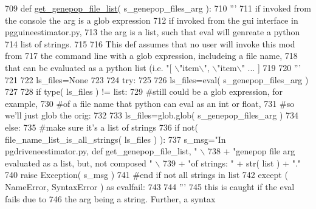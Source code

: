 \begin{DoxyCode}
709 \textcolor{keyword}{def }\hyperlink{namespacenegui_1_1pgdriveneestimator_ad0c4544bb6ce5bc184615cfade0f8495}{get\_genepop\_file\_list}( s\_genepop\_files\_arg ):
710     \textcolor{stringliteral}{'''}
711 \textcolor{stringliteral}{    if invoked from the console the arg is a glob expression}
712 \textcolor{stringliteral}{    if invoked from the gui interface in pgguineestimator.py,}
713 \textcolor{stringliteral}{    the arg is a list, such that eval will genreate a python}
714 \textcolor{stringliteral}{    list of strings.}
715 \textcolor{stringliteral}{}
716 \textcolor{stringliteral}{    This def assumes that no user will invoke this mod from }
717 \textcolor{stringliteral}{    the command line with a glob expression, includeing a file name,}
718 \textcolor{stringliteral}{    that can be evaluated as a python list (i.e. "[ \(\backslash\)"item\(\backslash\)", \(\backslash\)"item\(\backslash\)" ... ]}
719 \textcolor{stringliteral}{    }
720 \textcolor{stringliteral}{    '''}
721 
722     ls\_files=\textcolor{keywordtype}{None}
723 
724     \textcolor{keywordflow}{try}:
725 
726         ls\_files=eval( s\_genepop\_files\_arg )
727 
728         \textcolor{keywordflow}{if} type( ls\_files ) != list:
729             \textcolor{comment}{#still could be a glob expression, for example,}
730             \textcolor{comment}{#of a file name that python can eval as an int or float,}
731             \textcolor{comment}{#so we'll just glob the orig:}
732 
733             ls\_files=glob.glob( s\_genepop\_files\_arg )
734         \textcolor{keywordflow}{else}:
735             \textcolor{comment}{#make sure it's a list of strings}
736             \textcolor{keywordflow}{if} not( file\_name\_list\_is\_all\_strings( ls\_files ) ):
737                 s\_msg=\textcolor{stringliteral}{"In pgdriveneestimator.py, def get\_genepop\_file\_list, "} \(\backslash\)
738                         + \textcolor{stringliteral}{"genepop file arg evaluated as a list, but, not composed "} \(\backslash\)
739                         + \textcolor{stringliteral}{"of strings: "} + str( list ) + \textcolor{stringliteral}{"."}
740                 \textcolor{keywordflow}{raise} Exception( s\_msg )
741             \textcolor{comment}{#end if not all strings in list}
742     \textcolor{keywordflow}{except} ( NameError, SyntaxError ) \textcolor{keyword}{as} evalfail:
743 
744         \textcolor{stringliteral}{'''}
745 \textcolor{stringliteral}{        this is caught if the eval fails due to }
746 \textcolor{stringliteral}{        the arg being a string.  Further, a syntax}

\end{DoxyCode}
